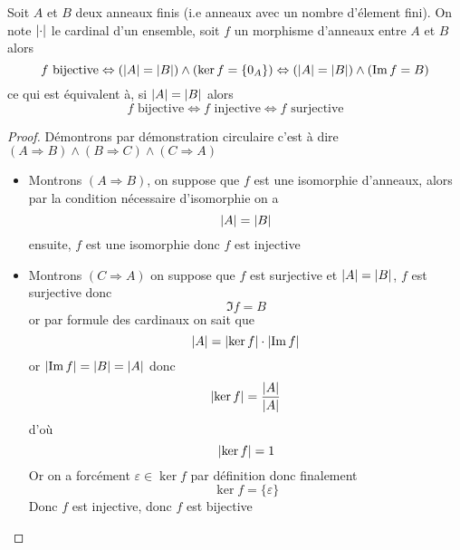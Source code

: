 \documentclass[11pt,colorlinks]{book}
\theoremstyle{mytheoremstyle}
\theoremstyle{mytheoremstyle}
\theoremstyle{mytheoremstyle}
\theoremstyle{mytheoremstyle}
\theoremstyle{mytheoremstyle}
\theoremstyle{mytheoremstyle}
\theoremstyle{mytheoremstyle}
\theoremstyle{mytheoremstyle}
\theoremstyle{myproblemstyle}
\begin{document}
\begin{theorem}
  Soit $A$ et $B$ deux anneaux finis (i.e anneaux avec un nombre d'élement fini). On note $\abs{\cdot}$ le cardinal d'un ensemble, 
  soit $f$ un morphisme d'anneaux entre $A$ et $B$ alors 
  \begin{equation*}
    f \text{ bijective} \Leftrightarrow (\abs{A} = \abs{B}) \wedge (\ker f = \{0_A\}) \Leftrightarrow (\abs{A} = \abs{B}) \wedge (\Im f = B)
  \end{equation*}
  ce qui est équivalent à, si $\abs{A} = \abs{B}$ alors 
  \begin{equation*}
    f \text{ bijective} \Leftrightarrow f \text{ injective} \Leftrightarrow f \text{ surjective}
  \end{equation*}
  \begin{proof}
    Démontrons par démonstration circulaire c'est à dire $(A \Rightarrow B) \wedge (B \Rightarrow C) \wedge (C \Rightarrow A)$
    \begin{itemize}
      \item Montrons $(A \Rightarrow B)$, on suppose que $f$ est une isomorphie d'anneaux, alors par la condition nécessaire d'isomorphie on a 
      \begin{equation*}
        \abs{A} = \abs{B}
      \end{equation*}
      ensuite, $f$ est une isomorphie donc $f$ est injective
      \item Montrons $(C \Rightarrow A)$ on suppose que $f$ est surjective et $\abs{A} = \abs{B}$, $f$ est surjective donc 
      \begin{equation*}
        \Im f = B
      \end{equation*}
      or par formule des cardinaux on sait que 
      \begin{equation*}
        \abs{A} = \abs{\ker f} \cdot \abs{\Im f}
      \end{equation*}
      or $\abs{\Im f} = \abs{B} = \abs{A}$ donc 
      \begin{equation*}
        \abs{\ker f} = \frac{\abs{A}}{\abs{A}}
      \end{equation*}
      d'où 
      \begin{equation*}
        \abs{\ker f} = 1
      \end{equation*}
      Or on a forcément $\varepsilon \in \ker f$ par définition donc finalement 
      \begin{equation*}
        \ker f = \{\varepsilon\}
      \end{equation*}
      Donc $f$ est injective, donc $f$ est bijective 

\end{itemize}
\end{proof}
\end{theorem}
\end{document}
